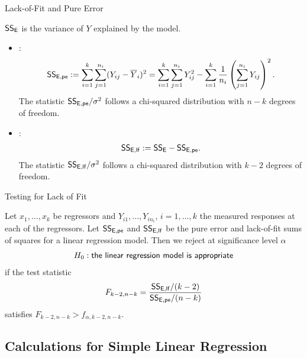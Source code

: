 \begin{frame}{Lack-of-Fit and Pure Error}

\justifying
{} $\mathsf{SS_E}$ is the variance of $Y$ explained by the model.
\begin{itemize}
	\justifying
	\item {}:
	\footnotesize
	\begin{align*}
	\mathsf{SS_{E,pe}} := \sum_{i=1}^k \sum_{j=1}^{n_i} (Y_{ij}-\overline{Y}_i)^2 = \sum_{i=1}^k\sum_{j=1}^{n_i} Y_{ij}^2 - \sum_{i=1}^k \frac{1}{n_i}\left(\sum_{j=1}^{n_i} Y_{ij} \right)^2.
	\end{align*}
	\normalsize
	The statistic $\mathsf{SS_{E,pe}}/\sigma^2$ follows a chi-squared distribution with $n-k$ degrees of freedom.
	\item {}:
	\footnotesize
	\begin{align*}
	\mathsf{SS_{E,lf}} := \mathsf{SS_E} - \mathsf{SS_{E,pe}}.
	\end{align*}
	\normalsize
	The statistic $\mathsf{SS_{E,lf}}/\sigma^2$ follows a chi-squared distribution with $k-2$ degrees of freedom.
\end{itemize}


\end{frame}


\begin{frame}{Testing for Lack of Fit}

\justifying
{} Let $x_1, \ldots, x_k$ be regressors and $Y_{i1}, \ldots, Y_{in_i}$, $i = 1, \ldots, k$ the measured responses at each of the regressors. Let $\mathsf{SS_{E,pe}}$ and $\mathsf{SS_{E,lf}}$ be the pure error and lack-of-fit sums of squares for a linear regression model. Then we reject at significance level $\alpha$
\begin{align*}
H_0: \mathsf{the\ linear\ regression\ model\ is\ appropriate}
\end{align*}
if the test statistic
\begin{align*}
F_{k-2,n-k} = \frac{\mathsf{SS_{E,lf}}/(k-2)}{\mathsf{SS_{E,pe}}/(n-k)}
\end{align*}
satisfies $F_{k-2,n-k} > f_{\alpha,k-2,n-k}$.

\end{frame}



\subsection{Calculations for Simple Linear Regression}

